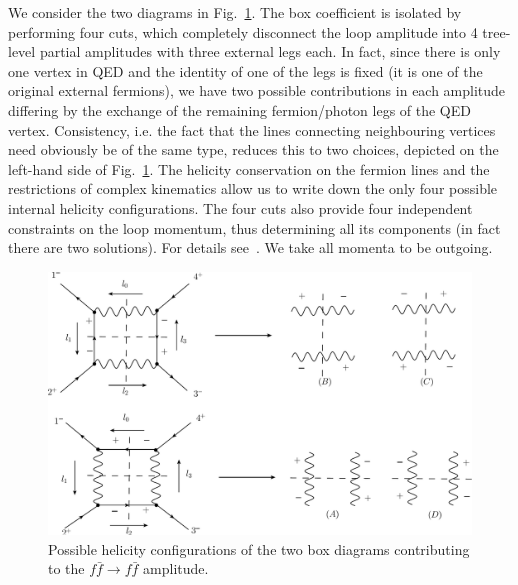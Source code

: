 \documentclass[preprint,number,12pt,sort&compress]{elsarticle}
\begin{document}
We consider the two diagrams in Fig.~\ref{fig:box4cut}.
The box coefficient is isolated by performing four cuts, 
which completely disconnect the loop amplitude into 4 tree-level
partial amplitudes with three external legs each.
In fact, since there is only one vertex in QED and the identity of one of
the legs is fixed (it is one of the original external fermions), 
we have two possible contributions in each amplitude differing by the 
exchange of the remaining fermion/photon legs of the QED vertex. 
Consistency, i.e. the fact that the lines connecting neighbouring vertices
need obviously be of the same type, reduces this to two choices,
depicted on the left-hand side of Fig.~\ref{fig:box4cut}.
The helicity conservation on the fermion lines and the restrictions of
complex kinematics allow us to write down the only four possible internal
helicity configurations.
The four cuts also provide four independent constraints on the loop momentum,
thus determining all its components (in fact there are two solutions).
For details see~\cite{Britto:2004nc}. We take all momenta to be outgoing.
\begin{figure}[h]
	\includegraphics[width=\textwidth]{chap5_2}
	\caption{Possible helicity configurations of the two box diagrams
	contributing to the $f\bar{f}\rightarrow f\bar{f}$ amplitude.}
	\label{fig:box4cut}
\end{figure}
\end{document}
